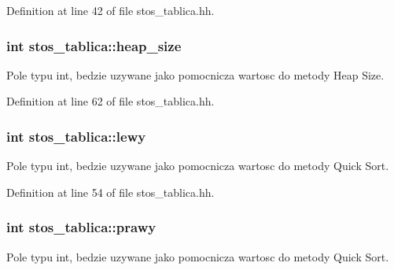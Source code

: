 Definition at line 42 of file stos\-\_\-tablica.\-hh.

\hypertarget{classstos__tablica_ae1737beb175c9041e44ff8b374fa3565}{
\subsubsection[{heap\-\_\-size}]{\setlength{\rightskip}{0pt plus 5cm}int stos\-\_\-tablica\-::heap\-\_\-size\hspace{0.3cm}{\ttfamily [private]}}}\label{classstos__tablica_ae1737beb175c9041e44ff8b374fa3565}


Pole typu int, bedzie uzywane jako pomocnicza wartosc do metody Heap Size. 



Definition at line 62 of file stos\-\_\-tablica.\-hh.

\hypertarget{classstos__tablica_addee4392050e497f2b9f07a5e7a17606}{
\subsubsection[{lewy}]{\setlength{\rightskip}{0pt plus 5cm}int stos\-\_\-tablica\-::lewy\hspace{0.3cm}{\ttfamily [private]}}}\label{classstos__tablica_addee4392050e497f2b9f07a5e7a17606}


Pole typu int, bedzie uzywane jako pomocnicza wartosc do metody Quick Sort. 



Definition at line 54 of file stos\-\_\-tablica.\-hh.

\hypertarget{classstos__tablica_aab32beac5ab0f185fb27492736798749}{
\subsubsection[{prawy}]{\setlength{\rightskip}{0pt plus 5cm}int stos\-\_\-tablica\-::prawy\hspace{0.3cm}{\ttfamily [private]}}}\label{classstos__tablica_aab32beac5ab0f185fb27492736798749}


Pole typu int, bedzie uzywane jako pomocnicza wartosc do metody Quick Sort. 



